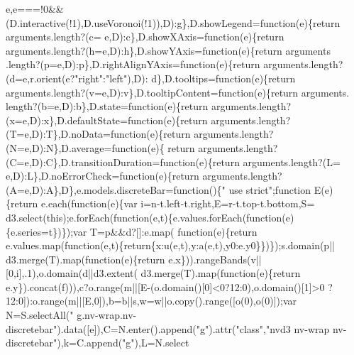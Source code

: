 \begin{DoxyCode}
      e,e===!0&&(D.interactive(!1),D.useVoronoi(!1)),D):g\},D.showLegend=\textcolor{keyword}{function}(e)\{\textcolor{keywordflow}{return} arguments.length?(c=
      e,D):c\},D.showXAxis=\textcolor{keyword}{function}(e)\{\textcolor{keywordflow}{return} arguments.length?(h=e,D):h\},D.showYAxis=\textcolor{keyword}{function}(e)\{\textcolor{keywordflow}{return} arguments
      .length?(p=e,D):p\},D.rightAlignYAxis=\textcolor{keyword}{function}(e)\{\textcolor{keywordflow}{return} arguments.length?(d=e,r.orient(e?\textcolor{stringliteral}{"right"}:\textcolor{stringliteral}{"left"}),D):
      d\},D.tooltips=\textcolor{keyword}{function}(e)\{\textcolor{keywordflow}{return} arguments.length?(v=e,D):v\},D.tooltipContent=\textcolor{keyword}{function}(e)\{\textcolor{keywordflow}{return} arguments.
      length?(b=e,D):b\},D.state=\textcolor{keyword}{function}(e)\{\textcolor{keywordflow}{return} arguments.length?(x=e,D):x\},D.defaultState=\textcolor{keyword}{function}(e)\{\textcolor{keywordflow}{return} 
      arguments.length?(T=e,D):T\},D.noData=\textcolor{keyword}{function}(e)\{\textcolor{keywordflow}{return} arguments.length?(N=e,D):N\},D.average=\textcolor{keyword}{function}(e)\{\textcolor{keywordflow}{
      return} arguments.length?(C=e,D):C\},D.transitionDuration=\textcolor{keyword}{function}(e)\{\textcolor{keywordflow}{return} arguments.length?(L=
      e,D):L\},D.noErrorCheck=\textcolor{keyword}{function}(e)\{\textcolor{keywordflow}{return} arguments.length?(A=e,D):A\},D\},e.models.discreteBar=\textcolor{keyword}{function}()\{\textcolor{stringliteral}{"
      use strict"};\textcolor{keyword}{function} E(e)\{\textcolor{keywordflow}{return} e.each(\textcolor{keyword}{function}(e)\{var i=n-t.left-t.right,E=r-t.top-t.bottom,S=
      d3.select(\textcolor{keyword}{this});e.forEach(\textcolor{keyword}{function}(e,t)\{e.values.forEach(\textcolor{keyword}{function}(e)\{e.series=t\})\});var T=p&&d?[]:e.map(\textcolor{keyword}{
      function}(e)\{\textcolor{keywordflow}{return} e.values.map(\textcolor{keyword}{function}(e,t)\{\textcolor{keywordflow}{return}\{x:u(e,t),y:a(e,t),y0:e.y0\}\})\});s.domain(p||
      d3.merge(T).map(\textcolor{keyword}{function}(e)\{\textcolor{keywordflow}{return} e.x\})).rangeBands(v||[0,i],.1),o.domain(d||d3.extent(
      d3.merge(T).map(\textcolor{keyword}{function}(e)\{\textcolor{keywordflow}{return} e.y\}).concat(f))),c?o.range(m||[E-(o.domain()[0]<0?12:0),o.domain()[1]>0
      ?12:0]):o.range(m||[E,0]),b=b||s,w=w||o.copy().range([o(0),o(0)]);var N=S.selectAll(\textcolor{stringliteral}{"
      g.nv-wrap.nv-discretebar"}).data([e]),C=N.enter().append(\textcolor{stringliteral}{"g"}).attr(\textcolor{stringliteral}{"class"},\textcolor{stringliteral}{"nvd3 nv-wrap nv-discretebar"}),k=C.append(\textcolor{stringliteral}{"g"}),L=N.select

\end{DoxyCode}
